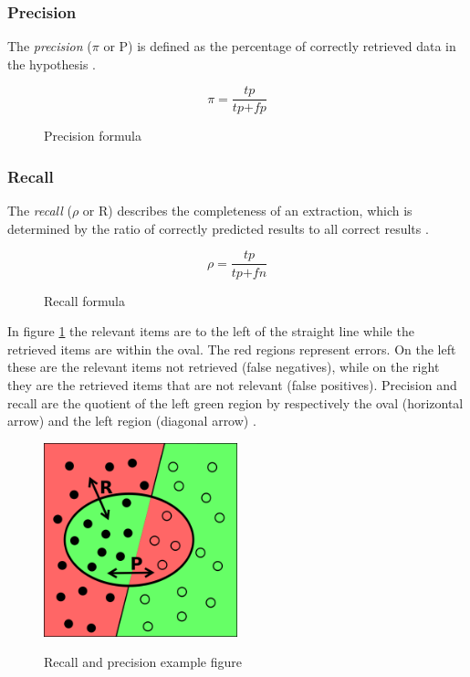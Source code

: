 \newpage
\subsubsection{Precision}
The \textit{precision} (\ensuremath{\pi} or P) is defined as the percentage of correctly retrieved data in the hypothesis \cite{Carstensen:2010}. 

\begin{figure}[H]
\begin{displaymath}
	\pi = \frac{\textit{tp}}{\textit{tp} + \textit{fp}}
\end{displaymath}
\caption{Precision formula}
\end{figure}

\subsubsection{Recall}
The \textit{recall} (\ensuremath{\rho} or R) describes the completeness of an extraction, which is determined by the ratio of correctly predicted results to all correct results \cite{Carstensen:2010}.

\begin{figure}[H]
\begin{displaymath}
	\rho = \frac{\textit{tp}}{\textit{tp} + \textit{fn}}
\end{displaymath}
\caption{Recall formula}
\end{figure}

In figure \ref{fig:recall-precision} the relevant items are to the left of the straight line while the retrieved items are within the oval. The red regions represent errors. On the left these are the relevant items not retrieved (false negatives), while on the right they are the retrieved items that are not relevant (false positives). Precision and recall are the quotient of the left green region by respectively the oval (horizontal arrow) and the left region (diagonal arrow) \cite{Wikipedia:Precision_and_recall}.

\begin{figure}[H]
\centering
\includegraphics[width=0.5\textwidth]{recall-precision.png}
\label{fig:recall-precision}
\caption{Recall and precision example figure \cite{Wikipedia:Precision_and_recall}}
\end{figure}

